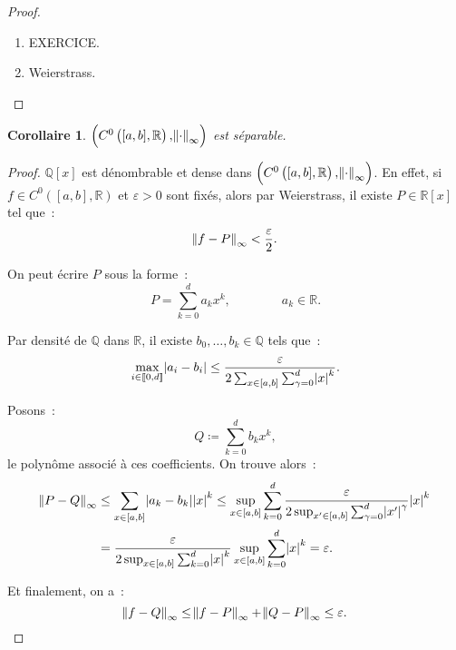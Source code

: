 \documentclass{report}
\newtheorem{cor}[thm]{Corollaire}
\theoremstyle{definition}
\theoremstyle{remark}
\numberwithin{equation}{section}
\newcommand{\R}{\mathbb R}
\newcommand{\Q}{\mathbb Q}
\newcommand{\intint}[2]{\left\llbracket#1, #2\right\rrbracket}
\newcommand{\evfn}[3]{\left(#1\left(#2, #3\right), \norm {\cdot}_{\infty}\right)}
\newcommand{\evnC}[3]{{\evfn {C^{#1}}{#2}{#3}}}
\begin{document}
		\begin{proof}~
		\begin{enumerate}
			\item EXERCICE.
			\item Weierstrass.
		\end{enumerate}
		\end{proof}

		\begin{cor} $\evnC0{[a, b]}\R$ est séparable.
		\end{cor}

		\begin{proof} $\Q[x]$ est dénombrable et dense dans $\evnC0{[a, b]}\R$. En effet, si $f \in C^0([a, b], \R)$ et $\varepsilon > 0$ sont fixés, alors par
		Weierstrass, il existe $P \in \R[x]$ tel que~:
		\begin{equation}
			\norm {f-P}_\infty < \frac \varepsilon2.
		\end{equation}

		On peut écrire $P$ sous la forme~:
		\begin{equation}
			P = \sum_{k=0}^da_kx^k,\qquad\qquad a_k \in \R.
		\end{equation}

		Par densité de $\Q$ dans $\R$, il existe $b_0, \ldots, b_k \in \Q$ tels que~:
		\begin{equation}
			\max_{i \in \intint 0d}\abs {a_i-b_i} \leq \frac \varepsilon{2\sum_{x \in [a, b]}\sum_{\gamma = 0}^d\abs x^k}.
		\end{equation}

		Posons~:
		\begin{equation}
			Q \coloneqq \sum_{k=0}^db_kx^k,
		\end{equation}
		le polynôme associé à ces coefficients. On trouve alors~:
		\begin{align}
			\norm {P-Q}_\infty &\leq \sum_{x \in [a, b]}\abs {a_k-b_k}\abs x^k
				\leq \sup_{x \in [a, b]}\sum_{k=0}^d\frac \varepsilon{2\sup_{x' \in [a, b]}\sum_{\gamma=0}^d\abs {x'}^\gamma}\abs {x}^k \\
			&= \frac \varepsilon{2\sup_{x \in [a, b]}\sum_{k=0}^d\abs x^k}\sup_{x \in [a, b]}\sum_{k=0}^d\abs x^k = \varepsilon.
		\end{align}

		Et finalement, on a~:
		\begin{equation}
			\norm {f-Q}_\infty \leq \norm {f-P}_\infty + \norm {Q-P}_\infty \leq \varepsilon.
		\end{equation}
		\end{proof}
\end{document}
